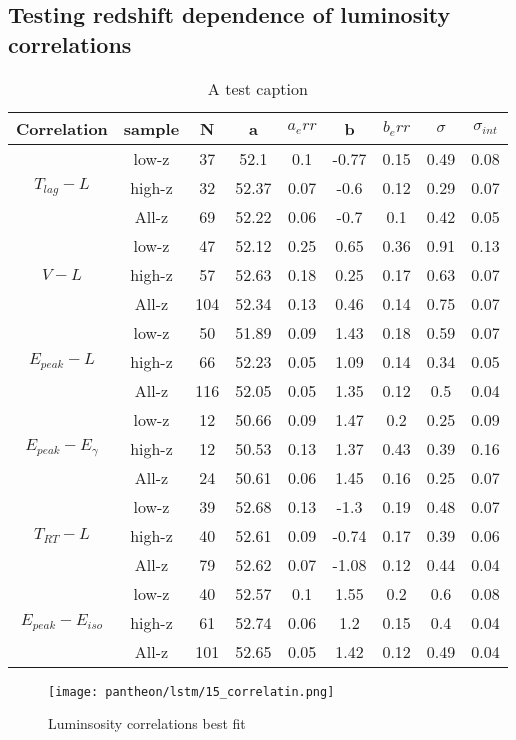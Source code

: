 \subsection{Testing redshift dependence of luminosity correlations}
\begin{table}
\centering
\begin{tabular}{|c|c|c|c|c|c|c|c|c|}
\hline
Correlation & sample & N & a & $a_err$ & b & $b_err$ & $\sigma$ & $\sigma_{int}$\\
\hline
\multirow{3}{*}{$T_{lag}-L$} & low-z & 37 & 52.1 & 0.1 & -0.77 & 0.15 & 0.49 & 0.08\\
\cline{2-9}
 & high-z & 32 & 52.37 & 0.07 & -0.6 & 0.12 & 0.29 & 0.07\\
\cline{2-9}
 & All-z & 69 & 52.22 & 0.06 & -0.7 & 0.1 & 0.42 & 0.05\\
\hline
\multirow{3}{*}{$V-L$} & low-z & 47 & 52.12 & 0.25 & 0.65 & 0.36 & 0.91 & 0.13\\
\cline{2-9}
 & high-z & 57 & 52.63 & 0.18 & 0.25 & 0.17 & 0.63 & 0.07\\
\cline{2-9}
 & All-z & 104 & 52.34 & 0.13 & 0.46 & 0.14 & 0.75 & 0.07\\
\hline
\multirow{3}{*}{$E_{peak}-L$} & low-z & 50 & 51.89 & 0.09 & 1.43 & 0.18 & 0.59 & 0.07\\
\cline{2-9}
 & high-z & 66 & 52.23 & 0.05 & 1.09 & 0.14 & 0.34 & 0.05\\
\cline{2-9}
 & All-z & 116 & 52.05 & 0.05 & 1.35 & 0.12 & 0.5 & 0.04\\
\hline
\multirow{3}{*}{$E_{peak}-E_{\gamma}$} & low-z & 12 & 50.66 & 0.09 & 1.47 & 0.2 & 0.25 & 0.09\\
\cline{2-9}
 & high-z & 12 & 50.53 & 0.13 & 1.37 & 0.43 & 0.39 & 0.16\\
\cline{2-9}
 & All-z & 24 & 50.61 & 0.06 & 1.45 & 0.16 & 0.25 & 0.07\\
\hline
\multirow{3}{*}{$T_{RT}-L$} & low-z & 39 & 52.68 & 0.13 & -1.3 & 0.19 & 0.48 & 0.07\\
\cline{2-9}
 & high-z & 40 & 52.61 & 0.09 & -0.74 & 0.17 & 0.39 & 0.06\\
\cline{2-9}
 & All-z & 79 & 52.62 & 0.07 & -1.08 & 0.12 & 0.44 & 0.04\\
\hline
\multirow{3}{*}{$E_{peak}-E_{iso}$} & low-z & 40 & 52.57 & 0.1 & 1.55 & 0.2 & 0.6 & 0.08\\
\cline{2-9}
 & high-z & 61 & 52.74 & 0.06 & 1.2 & 0.15 & 0.4 & 0.04\\
\cline{2-9}
 & All-z & 101 & 52.65 & 0.05 & 1.42 & 0.12 & 0.49 & 0.04\\
\hline
\end{tabular}
\caption{A test caption}
\label{table_pantheon_lstm}
\end{table}


\begin{figure}[H]
	\centering
	\texttt{[image: pantheon/lstm/15\_correlatin.png]}
	\caption{Luminsosity correlations best fit}
	\label{fig:correlation_lstm}
\end{figure}
